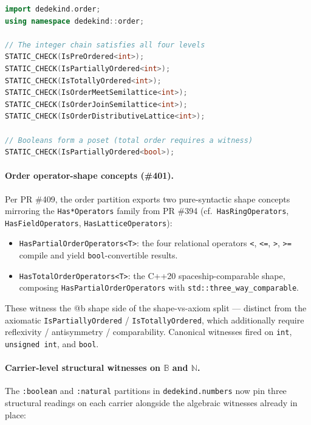 \documentclass[11pt, a4paper]{report}
\begin{document}
\begin{lstlisting}[language=C++, caption={Order: compile-time concept verification (from \texttt{order\_test.cpp}).}, label={lst:order}]
import dedekind.order;
using namespace dedekind::order;

// The integer chain satisfies all four levels
STATIC_CHECK(IsPreOrdered<int>);
STATIC_CHECK(IsPartiallyOrdered<int>);
STATIC_CHECK(IsTotallyOrdered<int>);
STATIC_CHECK(IsOrderMeetSemilattice<int>);
STATIC_CHECK(IsOrderJoinSemilattice<int>);
STATIC_CHECK(IsOrderDistributiveLattice<int>);

// Booleans form a poset (total order requires a witness)
STATIC_CHECK(IsPartiallyOrdered<bool>);
\end{lstlisting}

\paragraph{Order operator-shape concepts (\#401).} Per PR \#409, the order partition exports two pure-syntactic shape concepts mirroring the \texttt{Has*Operators} family from PR \#394 (cf.\ \texttt{HasRingOperators}, \texttt{HasFieldOperators}, \texttt{HasLatticeOperators}):

\begin{itemize}
  \item \texttt{HasPartialOrderOperators<T>}: the four relational operators \texttt{<}, \texttt{<=}, \texttt{>}, \texttt{>=} compile and yield \texttt{bool}-convertible results.
  \item \texttt{HasTotalOrderOperators<T>}: the C++20 spaceship-comparable shape, composing \texttt{HasPartialOrderOperators} with \texttt{std::three\_way\_comparable}.
\end{itemize}

These witness the @b shape side of the shape-vs-axiom split — distinct from the axiomatic \texttt{IsPartiallyOrdered} / \texttt{IsTotallyOrdered}, which additionally require reflexivity / antisymmetry / comparability.  Canonical witnesses fired on \texttt{int}, \texttt{unsigned int}, and \texttt{bool}.

\paragraph{Carrier-level structural witnesses on $\mathbb{B}$ and $\mathbb{N}$.} The \texttt{:boolean} and \texttt{:natural} partitions in \texttt{dedekind.numbers} now pin three structural readings on each carrier alongside the algebraic witnesses already in place:
\end{document}
